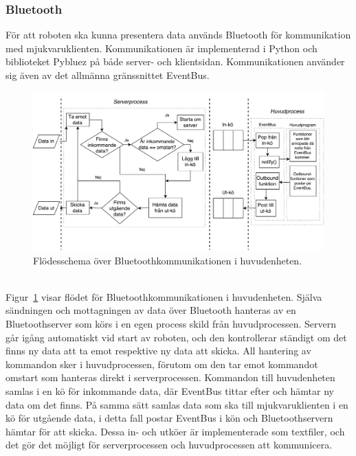 \documentclass{article}
\begin{document}
\subsubsection{Bluetooth}
För att roboten ska kunna presentera data används Bluetooth för kommunikation med mjukvaruklienten. Kommunikationen är implementerad i Python och biblioteket Pybluez på både server- och klientsidan. Kommunikationen använder sig även av det allmänna gränssnittet EventBus. 

\begin{figure}[H]
\centering
\includegraphics[scale=0.45]{bt-flow-main-unit}
\caption{Flödesschema över Bluetoothkommunikationen i huvudenheten.}
\label{fig:bt-flow-main-unit}
\end{figure}
\ \\
Figur~\ref{fig:bt-flow-main-unit} visar flödet för Bluetoothkommunikationen i huvudenheten. Själva sändningen och mottagningen av data över Bluetooth hanteras av en Bluetoothserver som körs i en egen process skild från huvudprocessen. Servern går igång automatiskt vid start av roboten, och den kontrollerar ständigt om det finns ny data att ta emot respektive ny data att skicka. All hantering av kommandon sker i huvudprocessen, förutom om den tar emot kommandot omstart som hanteras direkt i serverprocessen. Kommandon till huvudenheten samlas i en kö för inkommande data, där EventBus tittar efter och hämtar ny data om det finns. På samma sätt samlas data som ska till mjukvaruklienten i en kö för utgående data, i detta fall postar EventBus i kön och Bluetoothservern hämtar för att skicka. Dessa in- och utköer är implementerade som textfiler, och det gör det möjligt för serverprocessen och huvudprocessen att kommunicera.
\end{document}
